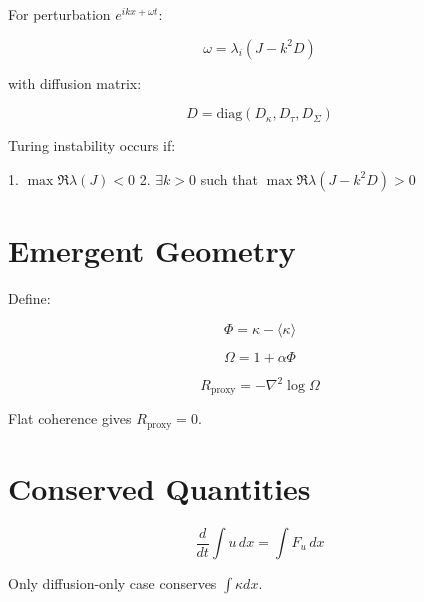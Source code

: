 \documentclass[11pt]{article}
\newcommand{\kappaF}{\kappa}
\newcommand{\PhiF}{\Phi}
\newcommand{\OmegaF}{\Omega}
\newcommand{\Rproxy}{R_{\mathrm{proxy}}}
\begin{document}
For perturbation $e^{ikx+\omega t}$:

\[
\omega = \lambda_i(J - k^2 D)
\]

with diffusion matrix:

\[
D = \mathrm{diag}(D_\kappa, D_\tau, D_\Sigma)
\]

Turing instability occurs if:

1. $\max \Re \lambda(J) < 0$  
2. $\exists k>0$ such that $\max \Re \lambda(J - k^2 D) > 0$

\section{Emergent Geometry}

Define:

\[
\PhiF = \kappaF - \langle \kappaF \rangle
\]

\[
\OmegaF = 1 + \alpha \PhiF
\]

\[
\Rproxy = -\nabla^2 \log \OmegaF
\]

Flat coherence gives $\Rproxy = 0$.

\section{Conserved Quantities}

\[
\frac{d}{dt} \int u \, dx = \int F_u \, dx
\]

Only diffusion-only case conserves $\int \kappaF dx$.
\end{document}
